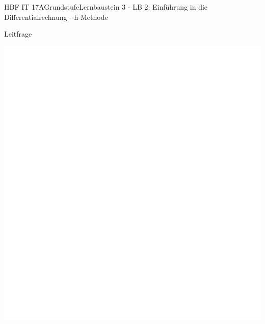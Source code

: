 \documentclass[oneside,openany,headings=optiontotoc,11pt,numbers=noenddot]{scrreprt}
\begin{document}
\begin{worksheet}{HBF IT 17A}{Grundstufe}{Lernbaustein 3 - LB 2: Einführung in die Differentialrechnung - h-Methode}
	\begin{framed}
		\noindent
		\tiny{\color{codegray}Leitfrage}\\
	\end{framed}
	
	\begin{framed}
		\includegraphics[scale=0.92]{../empty.jpg}
	\end{framed}
	\end{worksheet}
\end{document}

